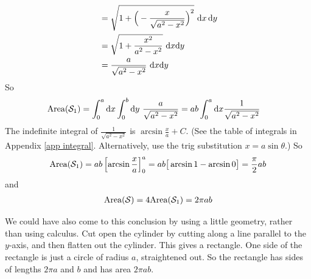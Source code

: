 \begin{eg}
\begin{align*}
   &=\sqrt{1+\Big(-\frac{x}{\sqrt{a^2-x^2}}\Big)^2} \ \dee{x}\,\dee{y} \\
   &=\sqrt{1+\frac{x^2}{a^2-x^2}} \ \dee{x}\dee{y} \\
   &=\frac{a}{\sqrt{a^2-x^2}} \ \dee{x}\dee{y} 
\end{align*}
So 
\begin{align*}
\text{Area}(\mathcal{S}_1) 
&= \int_0^a\mathrm{d}x\int_0^b\mathrm{d}y\ \frac{a}{\sqrt{a^2-x^2}} 
=ab \int_0^a\mathrm{d}x \frac{1}{\sqrt{a^2-x^2}}
\end{align*}
The indefinite integral of $\frac{1}{\sqrt{a^2-x^2}}$
is $\arcsin\frac{x}{a}+C$. (See the table of integrals in Appendix 
\ref{app integral}. Alternatively, use the trig substitution $x=a\sin\theta$.)
So
\begin{align*}
\text{Area}(\mathcal{S}_1) 
= ab\left[\arcsin\frac{x}{a}\right]_0^a
= ab\big[\arcsin 1 -\arcsin 0\big]
=\frac{\pi}{2} ab
\end{align*}
and
\begin{align*}
\text{Area}(\mathcal{S}) 
=4\text{Area}(\mathcal{S}_1) 
=2\pi ab
\end{align*}

We could have also come to this conclusion by using a little geometry,
rather than using calculus. Cut open the cylinder by cutting 
along a line parallel to the $y$-axis, and then flatten out the 
cylinder. This gives a rectangle. One side of the rectangle is just
a circle of radius $a$, straightened out. So the rectangle has sides 
of lengths $2\pi a$ and $b$ and has area $2\pi ab$.


\end{eg}


